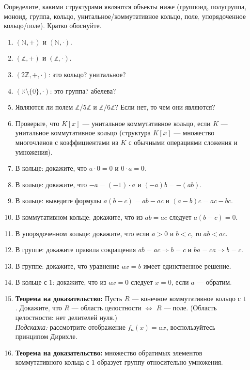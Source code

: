 \documentclass[11pt, a4paper]{extarticle}
\newcommand{\Z}{{\mathbb Z}}
\newcommand{\R}{{\mathbb R}}
\newcommand{\N}{{\mathbb N}}
\begin{document}
{
}

\begin{exercise}
Определите, какими структурами являются объекты ниже (группоид, полугруппа, моноид, группа, кольцо, унитальное/коммутативное кольцо, поле, упорядоченное кольцо/поле). Кратко обоснуйте.
\begin{enumerate}
    \item $(\N,+)$ и $(\N,\cdot)$.
    \item $(\Z,+)$ и $(\Z,\cdot)$.
    \item $(2\Z,+,\cdot)$: это кольцо? унитальное?
    \item $(\R\setminus\{0\},\cdot)$: это группа? абелева?
    \item Являются ли полем $\Z/5\Z$ и $\Z/6\Z$? Если нет, то чем они являются?
    \item Проверьте, что $K[x]$ --- унитальное коммутативное кольцо, если $K$ --- унитальное коммутативное кольцо (структура $K[x]$ --- множество многочленов с коэффициентами из $K$ с обычными операциями сложения и умножения).
    \item В кольце: докажите, что $a\cdot 0=0$ и $0\cdot a=0$.
    \item В кольце: докажите, что $-a=(-1)\cdot a$ и $(-a)b=-(ab)$.
    \item В кольце: выведите формулы $a(b-c)=ab-ac$ и $(a-b)c=ac-bc$.
    \item В коммутативном кольце: докажите, что из $ab=ac$ следует $a(b-c)=0$.
    \item В упорядоченном кольце: докажите, что если $a>0$ и $b<c$, то $ab<ac$.
    \item В группе: докажите правила сокращения $ab=ac \Rightarrow b=c$ и $ba=ca \Rightarrow b=c$.
    \item В группе: докажите, что уравнение $ax=b$ имеет единственное решение.
    \item В кольце с $1$: докажите, что из $ax=0$ следует $x=0$, если $a$ — обратим. 
    \item \textbf{Теорема на доказательство:} Пусть $R$ — конечное коммутативное кольцо с $1$. Докажите, что $R$ — область целостности $\Leftrightarrow$ $R$ — поле. (Область целостности: нет делителей нуля.)\\
    \textit{Подсказка:} рассмотрите отображение $f_a(x)=ax$, воспользуйтесь принципом Дирихле.
    \item \textbf{Теорема на доказательство:} множество обратимых элементов коммутативного кольца с $1$ образует группу относительно умножения.
\end{enumerate}
\end{exercise}
\end{document}
